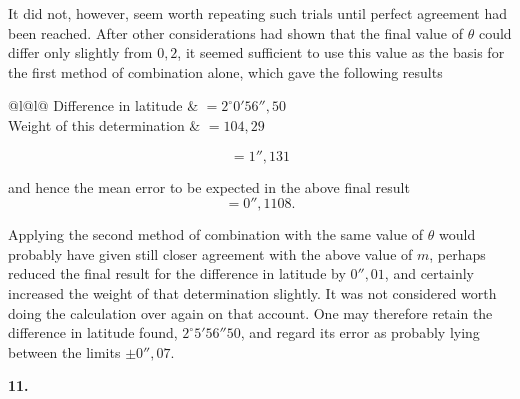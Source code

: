 It did not, however, seem worth repeating such trials until perfect
agreement had been reached. After other considerations had shown that
the final value of \(\theta\) could differ only slightly from \(0{,}2\),
it seemed sufficient to use this value as the basis for the first method
of combination alone, which gave
the following results
\begin{center}
\begin{tabular}{@{}l@{\quad}l@{}}
Difference in latitude & \(=2^\circ0'56''{,}50\)\\
Weight of this determination & \(=104{,}29\)\\
\end{tabular}
\end{center}
\[
=1''{,}131
\]

\par\clearpage
\noindent\makebox[12mm][l]{}\par\medskip

\noindent and hence the mean error to be expected in the above final result
\[
=0''{,}1108.
\]

Applying the second method of combination with the same value of
\(\theta\) would probably have given still closer agreement with the above
value of \(m\), perhaps reduced the final result for the difference in latitude
by \(0''{,}01\), and certainly increased the weight of that determination
slightly. It was not considered worth doing the calculation over again on
that account. One may therefore retain the difference in latitude found,
\(2^\circ5'56''50\), and regard its error as probably lying between
the limits \(\pm0''{,}07\).

\begin{center}\textbf{11.}\end{center}

